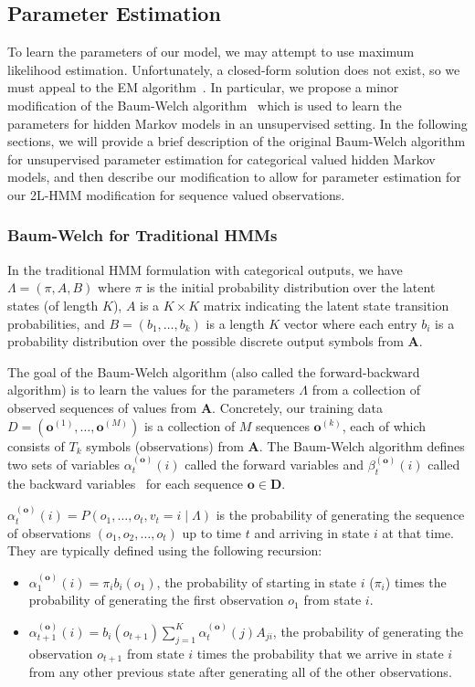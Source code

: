 \subsection{Parameter Estimation}
\label{sec:param-estimation}
To learn the parameters of our model, we may attempt to use maximum
likelihood estimation. Unfortunately, a closed-form solution does not
exist, so we must appeal to the EM algorithm~\cite{Dempster:1977:JRSS}. In
particular, we propose a minor modification of the Baum-Welch
algorithm~\cite{Rabiner:1990:RSR} which is used to learn the parameters for
hidden Markov models in an unsupervised setting. In the following sections,
we will provide a brief description of the original Baum-Welch algorithm
for unsupervised parameter estimation for categorical valued hidden Markov
models, and then describe our modification to allow for parameter
estimation for our 2L-HMM modification for sequence valued observations.

\subsubsection{Baum-Welch for Traditional HMMs}
In the traditional HMM formulation with categorical outputs, we have
$\Lambda = (\pi, A, B)$ where $\pi$ is the initial probability distribution
over the latent states (of length $K$), $A$ is a $K\times K$ matrix
indicating the latent state transition probabilities, and $B = (b_1,
\ldots, b_k)$ is a length $K$ vector where each entry $b_i$ is a
probability distribution over the possible discrete output symbols from
$\mathbf{A}$.

The goal of the Baum-Welch algorithm (also called the forward-backward
algorithm) is to learn the values for the parameters $\Lambda$ from a
collection of observed sequences of values from $\mathbf{A}$. Concretely,
our training data $D = (\mathbf{o}^{(1)}, \ldots, \mathbf{o}^{(M)})$ is a
collection of $M$ sequences $\mathbf{o}^{(k)}$, each of which consists of $T_k$
symbols (observations) from $\mathbf{A}$. The Baum-Welch algorithm defines
two sets of variables $\alpha^{(\mathbf{o})}_t(i)$ called the forward
variables and $\beta^{(\mathbf{o})}_t(i)$ called the backward
variables~\cite{Rabiner:1990:RSR} for each sequence $\mathbf{o} \in
\mathbf{D}$.

$\alpha^{(\mathbf{o})}_t(i) = P(o_1, \ldots, o_t, v_t = i \mid \Lambda)$ is
the probability of generating the sequence of observations $(o_1, o_2,
\ldots, o_t)$ up to time $t$ and arriving in state $i$ at that time. They
are typically defined using the following recursion:
\begin{itemize}
  \item $\alpha^{(\mathbf{o})}_1(i) = \pi_i b_i(o_1)$, the probability of starting in
    state $i$ ($\pi_i$) times the probability of generating the first
    observation $o_1$ from state $i$.
  \item $\alpha^{(\mathbf{o})}_{t+1}(i) = b_i(o_{t+1})\sum_{j=1}^K
    \alpha^{(\mathbf{o})}_t(j) A_{ji}$, the probability of generating the observation
    $o_{t+1}$ from state $i$ times the probability that we arrive in state
    $i$ from any other previous state after generating all of the other
    observations.
\end{itemize}

